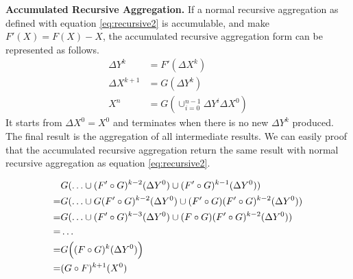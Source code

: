 {	\textbf{Accumulated Recursive Aggregation.} If a normal recursive aggregation  as defined with equation \ref{eq:recursive2} is accumulable, and make $F'(X)=F(X)-X$,  the accumulated recursive aggregation form can be represented as follows.
	\begin{equation}\label{eq:accumasync}
	\begin{aligned}
	\Delta Y^{k}&= F'(\Delta X^k)\\
	\Delta X^{k+1}&= G(\Delta Y^{k})\\
	X^{n}&=G(\cup_{i=0}^{n-1} \Delta Y^{i}\Delta X^0)
	\end{aligned}
	\end{equation}
	It starts from $\Delta X^0=X^0$ and terminates when there is no new $\Delta Y^k$ produced. The final result is the aggregation of all intermediate results. We can easily proof that the accumulated recursive aggregation return the same result with normal recursive aggregation as equation \ref{eq:recursive2}.
	
	

	{\color{yellow}
		\small
		\begin{align}
		&G( \ldots\cup (F'\circ G)^{k-2}(\Delta Y^0)\cup(F'\circ G)^{k-1}(\Delta Y^0))\notag \\
		=&G( \ldots\cup G(F'\circ G)^{k-2}(\Delta Y^0)\cup(F'\circ G)(F'\circ G)^{k-2}(\Delta Y^0))\notag\\
		=&G( \ldots\cup (F'\circ G)^{k-3}(\Delta Y^0)\cup(F\circ G)(F'\circ G)^{k-2}(\Delta Y^0))\notag\\
		=& \ldots \notag \\
		=&G\Big((F\circ G)^k(\Delta Y^0)\Big)\notag\\
		=&(G \circ F)^{k+1}(X^0)\notag
		\end{align}
		
}}
